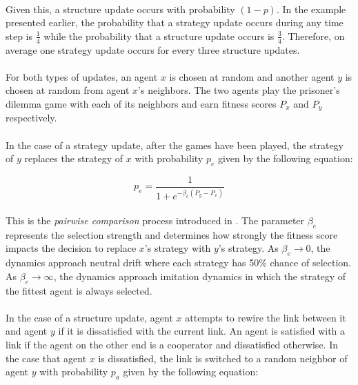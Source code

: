 \documentclass{article}
\begin{document}
	\paragraph{}Given this, a structure update occurs with probability $(1-p)$.  In the example presented earlier, the probability that a strategy update occurs during any time step is $\frac{1}{4}$ while the probability that a structure update occurs is $\frac{3}{4}$.  Therefore, on average one strategy update occurs for every three structure updates.
	\paragraph{}For both types of updates, an agent $x$ is chosen at random and another agent $y$ is chosen at random from agent $x$'s neighbors.  The two agents play the prisoner’s dilemma game with each of its neighbors and earn fitness scores $P_x$ and $P_y$ respectively.
	\paragraph{}In the case of a strategy update, after the games have been played, the strategy of $y$ replaces the strategy of $x$ with probability $p_e$ given by the following equation:

	\begin{equation}
	p_e=\frac{1}{1+e^{-\beta_e(P_y-P_x)}	}	
	\end{equation}

	\paragraph{}This is the \textit{pairwise comparison} process introduced in \cite{Traulsen2006}.  The parameter $\beta_e$ represents the selection strength and determines how strongly the fitness score impacts the decision to replace $x$'s strategy with $y$'s strategy.  As $\beta_e\to0$, the dynamics approach neutral drift where each strategy has 50\% chance of selection.  As $\beta_e\to\infty$, the dynamics approach imitation dynamics in which the strategy of the fittest agent is always selected.
	\paragraph{}In the case of a structure update, agent $x$ attempts to rewire the link between it and agent $y$ if it is dissatisfied with the current link.  An agent is satisfied with a link if the agent on the other end is a cooperator and dissatisfied otherwise.  In the case that agent $x$ is dissatisfied, the link is switched to a random neighbor of agent $y$ with probability $p_a$ given by the following equation:
	
\end{document}
